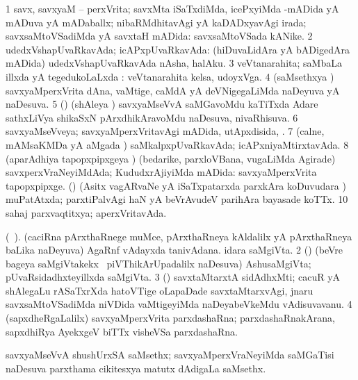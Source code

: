 {{{{{{{{{{{{{\bentry 
{} 
\gl{\gu}
\expl{}
\bmng
\bnum
\num{1} savx, savxyaM -- perxVrita; savxMta iSaTxdiMda, icePxyiMda -mADida yA mADuva yA mADaballx; nibaRMdhitavAgi yA kaDADxyavAgi irada; savxsaMtoVSadiMda yA savxtaH mADida:  savxsaMtoVSada kANike. 
\num{2} udedxVshapUvaRkavAda; icAPxpUvaRkavAda:  (hiDuvaLidAra yA bADigedAra mADida) udedxVshapUvaRkavAda nAsha, halAku. 
\num{3} veVtanarahita; saMbaLa illxda yA tegedukoLaLxda :  veVtanarahita kelsa, udoyxVga. 
\num{4} (saMsethxya \vi) savxyaMperxVrita dAna, vaMtige, caMdA yA deVNigegaLiMda naDeyuva yA naDesuva. 
\num{5} (\birx) (shAleya \vi) savxyaMseVvA saMGavoMdu kaTiTxda Adare sathxLiVya shikaSxN pArxdhikAravoMdu naDesuva, nivaRhisuva. 
\num{6} savxyaMseVveya; savxyaMperxVritavAgi mADida, utApxdisida, \mo. 
\num{7} (calne, mAMsaKMDa yA aMgada \vi) saMkalpxpUvaRkavAda; icAPxniyaMtirxtavAda. 
\num{8} (aparAdhiya tapopxpipxgeya \vi) (bedarike, parxloVBana, \mo vugaLiMda Agirade) savxperxVraNeyiMdAda; KududxrAjiyiMda mADida:  savxyaMperxVrita tapopxpipxge. (\nAyxshA) (Asitx vagARvaNe yA iSaTxpatarxda parxkAra koDuvudara \vi) muPatAtxda; parxtiPalvAgi haN yA beVrAvudeV parihAra bayasade koTTx. 
\num{10} sahaj parxvaqtitxya; aperxVritavAda. 
\enum
\emng
\eentry

\bentry 
{} 
\gl{\nA}(\bava\ ). 
\bmng
\bnum
{} 
\banum
{} (caciRna pArxthaRnege muMce, pArxthaRneya kAldalilx yA pArxthaRneya baLika naDeyuva) AgaRnf vAdayxda tanivAdana. 
 idara saMgiVta. 
\eanum
\numie
\num{2} (\pArxparx) (beVre bageya saMgiVtakekx \kanmu\ piVThikArUpadalilx naDesuva) AshusaMgiVta; pUvaRsidadhxteyillxda saMgiVta. 
\num{3} (\ca) savxtaMtarxtA sidAdhxMti; cacuR yA shAlegaLu rASaTxrXda hatoVTige oLapaDade savxtaMtarxvAgi, jnaru savxsaMtoVSadiMda niVDida vaMtigeyiMda naDeyabeVkeMdu vAdisuvavanu. 
\num{4} (sapxdheRgaLalilx) savxyaMperxVrita parxdashaRna; parxdashaRnakArana, sapxdhiRya AyekxgeV biTTx visheVSa parxdashaRna. 
\enum
\emng
\eentry
 
\bentry
{}
\gl{\nA}
\expl{}
\bmng
 savxyaMseVvA shushUrxSA saMsethx; savxyaMperxVraNeyiMda saMGaTisi naDesuva parxthama cikitesxya matutx dAdigaLa saMsethx. 
\emng
\eentry

\bentry 
{}
\gl{\nA}
\expl{}
\bmng
\emng
\eentry

}}}}}}}}}}}}}
